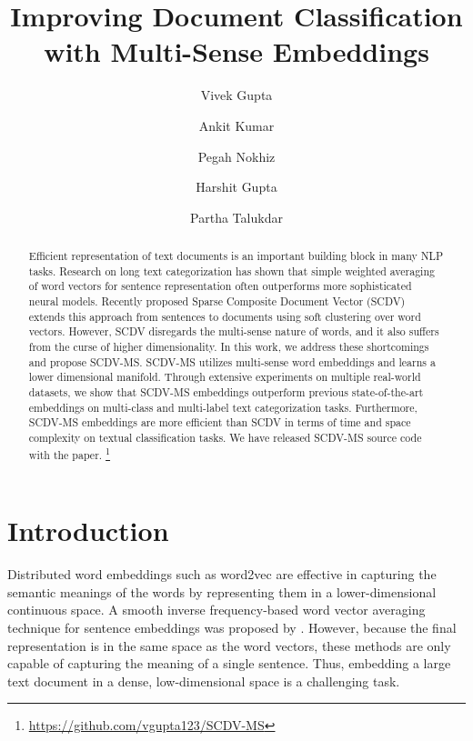 \documentclass{ecai}
\begin{document}
\title{Improving Document Classification with Multi-Sense Embeddings}

\author{Vivek Gupta \and Ankit Kumar \and Pegah Nokhiz \and Harshit Gupta \and Partha Talukdar}

\maketitle


\begin{abstract}
Efficient representation of text documents is an important building block in many NLP tasks. Research on long text categorization has shown that simple weighted averaging of word vectors for sentence representation often outperforms more sophisticated neural models. Recently proposed Sparse Composite Document Vector (SCDV) \cite{mekala2017scdv} extends this approach from sentences to documents using soft clustering over word vectors. However, SCDV disregards the multi-sense nature of words, and it also suffers from the curse of higher dimensionality. In this work, we address these shortcomings and propose SCDV-MS. SCDV-MS utilizes multi-sense word embeddings and learns a lower dimensional manifold. Through extensive experiments on multiple real-world datasets, we show that SCDV-MS embeddings outperform previous state-of-the-art embeddings on multi-class and multi-label text categorization tasks. Furthermore, SCDV-MS embeddings are more efficient than SCDV in terms of time and space complexity on textual classification tasks. We have released SCDV-MS source code with the paper. \footnote{\url{https://github.com/vgupta123/SCDV-MS}}
\end{abstract}

\section{Introduction}
\label{sec:introduction}

Distributed word embeddings such as word2vec \cite{mikolov2013linguistic} are effective in capturing the semantic meanings of the words by representing them in a lower-dimensional continuous space. A smooth inverse frequency-based word vector averaging technique for sentence embeddings was proposed by \cite{arora2016simple}. However, because the final representation is in the same space as the word vectors, these methods are only capable of capturing the meaning of a single sentence. Thus, embedding a large text document in a dense, low-dimensional space is a challenging task.
\end{document}
